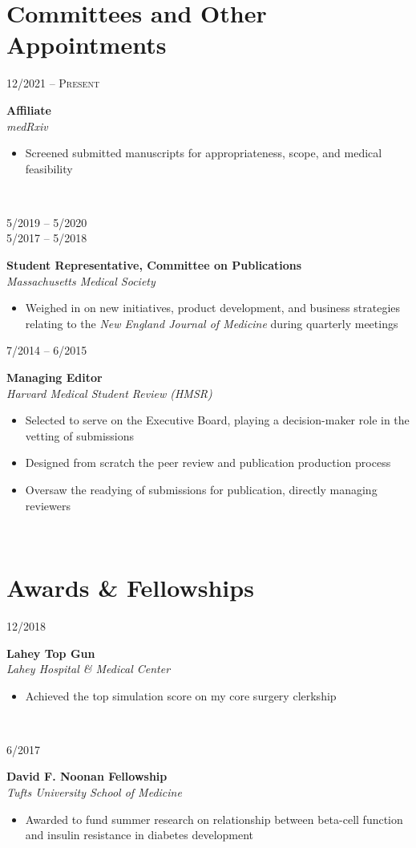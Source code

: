 \documentclass{article}
\newcommand\colleft{.20}
\newcommand\colright{.75}
\newcommand{\entryfour}[4]
	{
		\begin{minipage}[t]{\colleft\textwidth}
		\hfill \textsc{#1}
		\end{minipage}
		\hfill\vline\hfill
		\begin{minipage}[t]{\colright\textwidth}
		{\bf#2}\\
		\textit{#3}
		\footnotesize{#4}
		\end{minipage}\\
		\entryvspace
	}%
\newcommand{\entryvspace}{\vspace{0.5em}}
\begin{document}
	\section*{Committees and Other Appointments}
		\entryfour{12/2021 -- Present}{Affiliate}{medRxiv}{%
			\begin{itemize}
				\item Screened submitted manuscripts for appropriateness, scope, and medical feasibility
		\end{itemize}
		}


\begin{minipage}[t]{\colleft\textwidth}
	\vspace{0.1pc}
	\begin{flushright}
		5/2019 -- 5/2020\\
		5/2017 -- 5/2018
	\end{flushright}
\end{minipage}
\hfill\vline\hfill
\begin{minipage}[t]{\colright\textwidth}
	{\bf Student Representative, Committee on Publications}\\
	\textit{Massachusetts Medical Society}
	\footnotesize{%
		\begin{itemize}
			\item  Weighed in on new initiatives, product development, and business strategies relating to the \emph{New England Journal of Medicine} during quarterly meetings
		\end{itemize}
	}
\end{minipage}
\entryvspace


	\entryfour{7/2014 -- 6/2015}{Managing Editor}{Harvard Medical Student Review (HMSR)}{%
	\begin{itemize}
		\item Selected to serve on the Executive Board, playing a decision-maker role in the vetting of submissions
		\item Designed from scratch the peer review and publication production process
		\item Oversaw the readying of submissions for publication, directly managing reviewers
	\end{itemize}
	}

	\section*{Awards \& Fellowships}
	\entryfour{12/2018}{Lahey Top Gun}{Lahey Hospital \& Medical Center}{%
		\begin{itemize}
			\item Achieved the top simulation score on my core surgery clerkship
			\end{itemize}
		}
	
	\entryfour{6/2017}{David F. Noonan Fellowship}{Tufts University School of Medicine}{%
		\begin{itemize}
			\item Awarded to fund summer research on relationship between beta-cell function and insulin
			resistance in diabetes development
			\end{itemize}
		}
	
\end{document}
